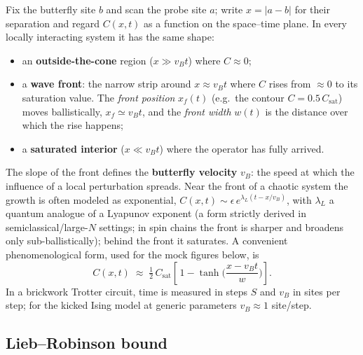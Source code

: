 \documentclass[11pt]{article}
\begin{document}
Fix the butterfly site $b$ and scan the probe site $a$; write $x=|a-b|$ for
their separation and regard $C(x,t)$ as a function on the space--time plane.
In every locally interacting system it has the same shape:
\begin{itemize}
  \item an \textbf{outside-the-cone} region ($x \gg v_B t$) where
  $C \approx 0$;
  \item a \textbf{wave front}: the narrow strip around $x \approx v_B t$
  where $C$ rises from $\approx 0$ to its saturation value. The
  \emph{front position} $x_f(t)$ (e.g.\ the contour $C = 0.5\,
  C_{\mathrm{sat}}$) moves ballistically, $x_f \simeq v_B t$, and the
  \emph{front width} $w(t)$ is the distance over which the rise happens;
  \item a \textbf{saturated interior} ($x \ll v_B t$) where the operator has
  fully arrived.
\end{itemize}
The slope of the front defines the \textbf{butterfly velocity} $v_B$: the
speed at which the influence of a local perturbation spreads. Near the front
of a chaotic system the growth is often modeled as exponential,
$C(x,t) \sim \epsilon\, e^{\lambda_L (t - x/v_B)}$, with $\lambda_L$ a
quantum analogue of a Lyapunov exponent (a form strictly derived in
semiclassical/large-$N$ settings; in spin chains the front is sharper and
broadens only sub-ballistically); behind the front it saturates. A
convenient phenomenological form, used for the mock figures below, is
\begin{equation}
  C(x,t) \;\approx\; \tfrac{1}{2}\,C_{\mathrm{sat}}
  \left[\,1 - \tanh\!\Big(\frac{x - v_B t}{w}\Big)\right].
  \label{eq:tanhfront}
\end{equation}
In a brickwork Trotter circuit, time is measured in steps $S$ and $v_B$ in
sites per step; for the kicked Ising model at generic parameters
$v_B \approx 1$ site/step.

\subsection{Lieb--Robinson bound}
\label{sec:lr}
\end{document}
